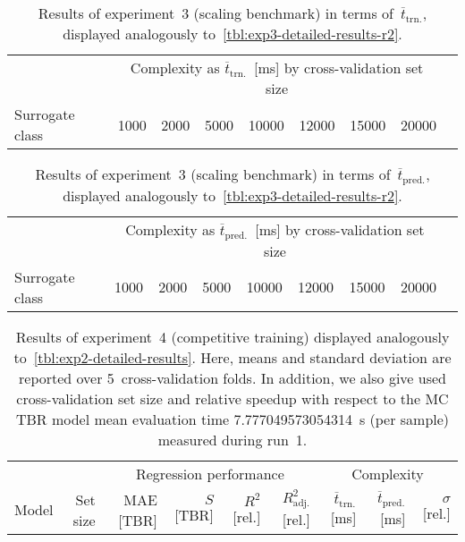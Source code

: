 \begin{table}[h]
	\centering
	{\footnotesize
		\begin{tabular}{lrrrrrrrr}
		\toprule
		{} & \multicolumn{7}{c}{Complexity as $\overline{t}_{\text{trn.}}$~[ms] by cross-validation set size}\\
		\cmidrule(lr){2-8}
		Surrogate class
						& \num{1000}
						& \num{2000}
						& \num{5000}
						& \num{10000}
						& \num{12000}
						& \num{15000}
						& \num{20000}\\
		\midrule
		
		\bottomrule
		\end{tabular}
	}
	\caption{Results of experiment~3 (scaling benchmark) in terms of~$\overline{t}_{\text{trn.}}$,
	displayed analogously to~\cref{tbl:exp3-detailed-results-r2}.}
	\label{tbl:exp3-detailed-results-t-train}
\end{table}


\begin{table}[h]
	\centering
	{\footnotesize
		\begin{tabular}{lrrrrrrrr}
		\toprule
		{} & \multicolumn{7}{c}{Complexity as $\overline{t}_{\text{pred.}}$~[ms] by cross-validation set size}\\
		\cmidrule(lr){2-8}
		Surrogate class
						& \num{1000}
						& \num{2000}
						& \num{5000}
						& \num{10000}
						& \num{12000}
						& \num{15000}
						& \num{20000}\\
		\midrule
		
		\bottomrule
		\end{tabular}
	}
	\caption{Results of experiment~3 (scaling benchmark) in terms of~$\overline{t}_{\text{pred.}}$,
	displayed analogously to~\cref{tbl:exp3-detailed-results-r2}.}
	\label{tbl:exp3-detailed-results-t-pred}
\end{table}


\begin{table}[h]
	\centering
	{\footnotesize
		\begin{tabular}{lrrrrrrrr}
		\toprule
		{} & {} & \multicolumn{4}{c}{Regression performance} &
		\multicolumn{3}{c}{Complexity}\\
		\cmidrule(lr){3-6}
		\cmidrule(lr){7-9}
		Model & Set size & MAE [TBR] & $S$ [TBR] & $R^2$ [rel.] & $R^2_{\text{adj.}}$ [rel.]
						& $\overline{t}_{\text{trn.}}$ [ms] &
		$\overline{t}_{\text{pred.}}$ [ms] & $\sigma$ [rel.]\\
		\midrule
		
		\bottomrule
		\end{tabular}
	}
	\caption{Results of experiment~4 (competitive training) displayed analogously
		to~\cref{tbl:exp2-detailed-results}. Here, means and standard deviation
		are reported over 5~cross-validation folds. In addition, we also give
		used cross-validation set size and relative speedup with respect to the
		MC TBR model mean evaluation time \SI{7.777049573054314}{\second} (per
		sample) measured during run~1.}
	\label{tbl:exp4-detailed-results}
\end{table}

